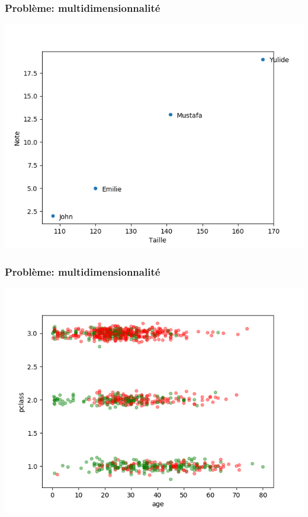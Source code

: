 \documentclass[11pt]{beamer}
\newenvironment{slide}[1]{%
\begin{frame}[environment=slide]
\frametitle{#1}
}{%
\end{frame}
}
\begin{document}
\begin{slide}{Problème: multidimensionnalité}

\begin{center}

\includegraphics[scale=0.4]{plot1}

\end{center}
\end{slide}

\begin{slide}{Problème: multidimensionnalité}
\begin{center}
\includegraphics[scale=0.4]{titanic_plot}
\end{center}
\end{slide}
\end{document}
